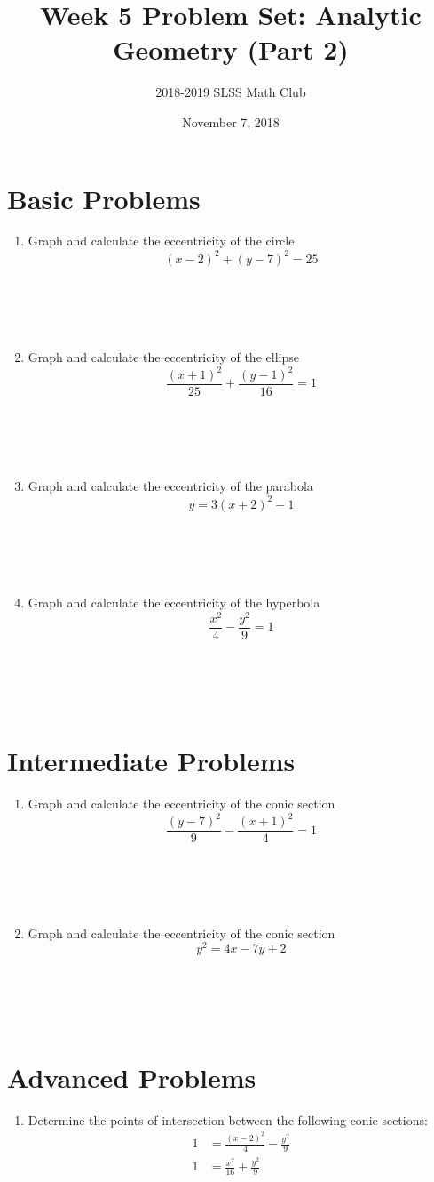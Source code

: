 \documentclass[12pt]{article}
\title{Week 5 Problem Set: Analytic Geometry (Part 2)\vspace{-3mm}}
\author{2018-2019 SLSS Math Club\vspace{-5mm}}
\date{November 7, 2018\vspace{-5mm}}
\newcommand{\bspace}{\\ \\ \\ \\}
\begin{document}
\maketitle

\section*{Basic Problems}
\begin{enumerate}
    \item Graph and calculate the eccentricity of the circle \begin{equation*} (x - 2)^2 + (y - 7)^2 = 25 \end{equation*} \bspace
    
    \item Graph and calculate the eccentricity of the ellipse \begin{equation*} \frac{(x + 1)^2}{25} + \frac{(y-1)^2}{16} = 1 \end{equation*} \bspace
    
    \item Graph and calculate the eccentricity of the parabola \begin{equation*} y = 3(x + 2)^2 - 1\end{equation*} \bspace
    
    \item Graph and calculate the eccentricity of the hyperbola \begin{equation*} \frac{x^2}{4} - \frac{y^2}{9} = 1\end{equation*} \bspace
\end{enumerate}

\section*{Intermediate Problems}
\begin{enumerate}
    \item Graph and calculate the eccentricity of the conic section \begin{equation*} \frac{(y - 7)^2}{9} - \frac{(x + 1)^2}{4} = 1\end{equation*} \bspace
    
    \item Graph and calculate the eccentricity of the conic section \begin{equation*} y^2 = 4x - 7y + 2\end{equation*} \bspace
\end{enumerate}

\section*{Advanced Problems}
\begin{enumerate}
    \item Determine the points of intersection between the following conic sections:
    \begin{align*}
        1 &= \frac{(x - 2)^2}{4} - \frac{y^2}{9} \\
        1 &= \frac{x^2}{16} + \frac{y^2}{9} 
    \end{align*}
\end{enumerate}
\end{document}

